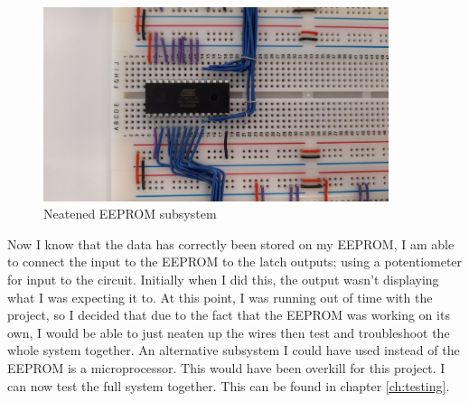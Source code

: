 \begin{figure} [H]
    \centering
    \begin{minipage}[t]{0.45\textwidth}
        \centering
        \includegraphics[width=0.9\textwidth]{images/eepromNeatened.jpg}
        \caption{Neatened EEPROM subsystem}
        \label{fig:eepromNeatened}
    \end{minipage}\hfill
    \begin{minipage}[t] {0.45\textwidth}
        \centering
    \end{minipage}
\end{figure}
\noindent Now I know that the data has correctly been stored on my EEPROM, I am able to connect the input to the EEPROM to the latch outputs; using a potentiometer for input to the circuit. Initially when I did this, the output wasn't displaying what I was expecting it to.  At this point, I was running out of time with the project, so I decided that due to the fact that the EEPROM was working on its own, I would be able to just neaten up the wires then test and troubleshoot the whole system together.\newline
An alternative subsystem I could have used instead of the EEPROM is a microprocessor. This would have been overkill for this project. \newline
\noindent I can now test the full system together. This can be found in chapter \ref{ch:testing}.